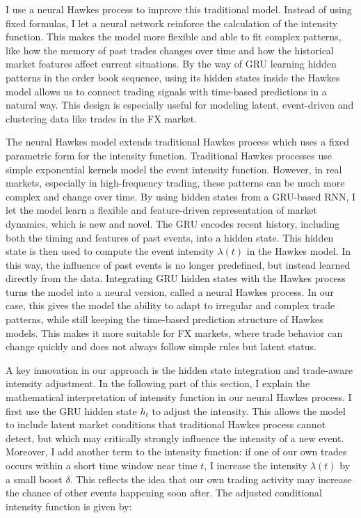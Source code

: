 I use a neural Hawkes process to improve this traditional model. Instead of using fixed formulas, I let a neural network reinforce the calculation of the intensity function. This makes the model more flexible and able to fit complex patterns, like how the memory of past trades changes over time and how the historical market features affect current situations. By the way of GRU learning hidden patterns in the order book sequence, using its hidden states inside the Hawkes model allows us to connect trading signals with time-based predictions in a natural way. This design is especially useful for modeling latent, event-driven and clustering data like trades in the FX market.


The neural Hawkes model extends traditional Hawkes process which uses a fixed parametric form for the intensity function. Traditional Hawkes processes use simple exponential kernels model the event intensity function. However, in real markets, especially in high-frequency trading, these patterns can be much more complex and change over time. By using hidden states from a GRU-based RNN, I let the model learn a flexible and feature-driven representation of market dynamics, which is new and novel. The GRU encodes recent history, including both the timing and features of past events, into a hidden state. This hidden state is then used to compute the event intensity $\lambda(t)$ in the Hawkes model. In this way, the influence of past events is no longer predefined, but instead learned directly from the data. Integrating GRU hidden states with the Hawkes process turns the model into a neural version, called a neural Hawkes process. In our case, this gives the model the ability to adapt to irregular and complex trade patterns, while still keeping the time-based prediction structure of Hawkes models. This makes it more suitable for FX markets, where trade behavior can change quickly and does not always follow simple rules but latent status.


A key innovation in our approach is the hidden state integration and trade-aware intensity adjustment. In the following part of this section, I explain the mathematical interpretation of intensity function in our neural Hawkes process. I first use the GRU hidden state $h_t$ to adjust the intensity. This allows the model to include latent market conditions that traditional Hawkes process cannot detect, but which may critically strongly influence the intensity of a new event. Moreover, I add another term to the intensity function: if one of our own trades occurs within a short time window near time $t$, I increase the intensity $\lambda(t)$ by a small boost $\delta$. This reflects the idea that our own trading activity may increase the chance of other events happening soon after. The adjusted conditional intensity function is given by:


